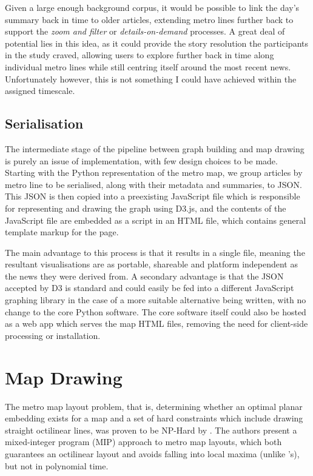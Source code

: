 Given a large enough background corpus, it would be possible to link the day's summary back in time to older articles, extending metro lines further back to support the \textit{zoom and filter} or \textit{details-on-demand} processes. A great deal of potential lies in this idea, as it could provide the story resolution the participants in the \cite{anewmodelfornews} study craved, allowing users to explore further back in time along individual metro lines while still centring itself around the most recent news. Unfortunately however, this is not something I could have achieved within the assigned timescale. 


\subsection{Serialisation}
The intermediate stage of the pipeline between graph building and map drawing is purely an issue of implementation, with few design choices to be made. Starting with the Python representation of the metro map, we group articles by metro line to be serialised, along with their metadata and summaries, to JSON. This JSON is then copied into a preexisting JavaScript file which is responsible for representing and drawing the graph using D3.js, and the contents of the JavaScript file are embedded as a script in an HTML file, which contains general template markup for the page. 

The main advantage to this process is that it results in a single file, meaning the resultant visualisations are as portable, shareable and platform independent as the news they were derived from. A secondary advantage is that the JSON accepted by D3 is standard and could easily be fed into a different JavaScript graphing library in the case of a more suitable alternative being written, with no change to the core Python software. The core software itself could also be hosted as a web app which serves the map HTML files, removing the need for client-side processing or installation.

\clearpage
\section{Map Drawing} \label{sec:drawing}

The metro map layout problem, that is, determining whether an optimal planar embedding exists for a map and a set of hard constraints which include drawing straight octilinear lines, was proven to be NP-Hard by \cite{AutomatedDrawingOfMetroMaps}. The authors present a mixed-integer program (MIP) approach to metro map layouts, which both guarantees an octilinear layout and avoids falling into local maxima (unlike \citeauthor{AutomaticMetroMapLayoutThesis}'s), but not in polynomial time.

